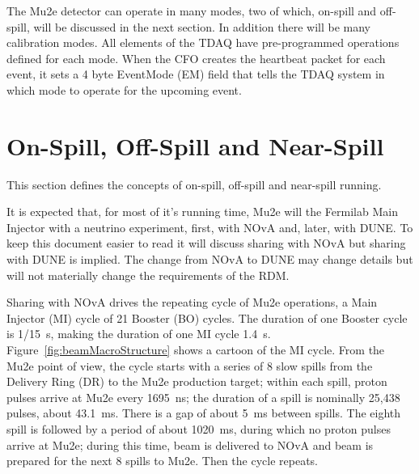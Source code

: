 The Mu2e detector can operate in many modes, two of which,
on-spill and off-spill, will be discussed in the next section.
In addition there will be many calibration modes.
All elements of the TDAQ have pre-programmed operations defined for each mode.
When the CFO creates the heartbeat packet for each event,
it sets a 4 byte EventMode (EM) field
that tells the TDAQ system in which mode to operate for the upcoming event.

\section{On-Spill, Off-Spill and Near-Spill}

This section defines the concepts of on-spill, off-spill and near-spill running.

It is expected that, for most of it's running time,
Mu2e will the Fermilab Main Injector with a neutrino experiment,
first, with NOvA and, later, with DUNE.
To keep this document easier to read it will discuss sharing with NOvA but sharing with DUNE is implied.
The change from NOvA to DUNE may change details
but will not materially change the requirements of the RDM.

Sharing with NOvA drives the repeating cycle of Mu2e operations, a Main Injector (MI) cycle of
21 Booster (BO) cycles.
The duration of one Booster cycle is 1/15~s,
making the duration of one MI cycle 1.4~s.
Figure~\ref{fig:beamMacroStructure} shows a cartoon of the MI cycle.
From the Mu2e point of view, the cycle starts with a series of 8 slow spills
from the Delivery Ring (DR) to the Mu2e production target;
within each spill, proton pulses arrive at Mu2e every 1695~ns;
the duration of a spill is nominally 25,438 pulses, about 43.1~ms.
There is a gap of about 5~ms between spills.
The eighth spill is followed by a period of about 1020~ms,
during which no proton pulses arrive at Mu2e;
during this time, beam is delivered to NOvA
and beam is prepared for the next 8 spills to Mu2e.
Then the cycle repeats.

